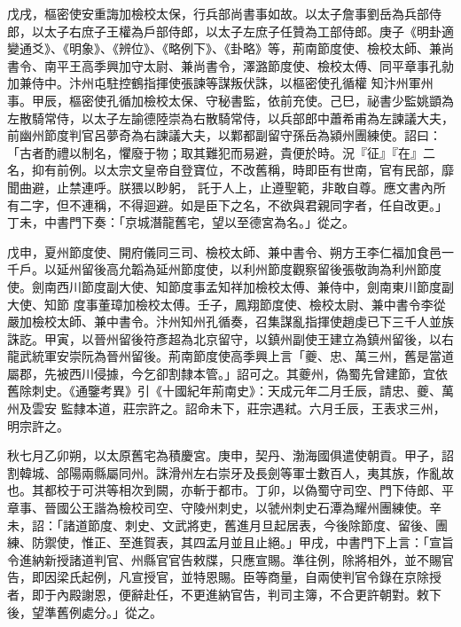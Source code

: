 \begin{pinyinscope}
 戊戌，樞密使安重誨加檢校太保，行兵部尚書事如故。以太子詹事劉岳為兵部侍郎，以太子右庶子王權為戶部侍郎，以太子左庶子任贊為工部侍郎。庚子《明卦適變通爻》、《明象》、《辨位》、《略例下》、《卦略》等，荊南節度使、檢校太師、兼尚書令、南平王高季興加守太尉、兼尚書令，澤潞節度使、檢校太傅、同平章事孔勍加兼侍中。汴州屯駐控鶴指揮使張諫等謀叛伏誅，以樞密使孔循權
 知汴州軍州事。甲辰，樞密使孔循加檢校太保、守秘書監，依前充使。己巳，祕書少監姚顗為左散騎常侍，以太子左諭德陸崇為右散騎常侍，以兵部郎中蕭希甫為左諫議大夫，前幽州節度判官呂夢奇為右諫議大夫，以鄴都副留守孫岳為潁州團練使。詔曰：「古者酌禮以制名，懼廢于物；取其難犯而易避，貴便於時。況『征』『在』二名，抑有前例。以太宗文皇帝自登寶位，不改舊稱，時即臣有世南，官有民部，靡聞曲避，止禁連呼。朕猥以眇躬，
 託于人上，止遵聖範，非敢自尊。應文書內所有二字，但不連稱，不得迴避。如是臣下之名，不欲與君親同字者，任自改更。」丁未，中書門下奏：「京城潛龍舊宅，望以至德宮為名。」從之。



 戊申，夏州節度使、開府儀同三司、檢校太師、兼中書令、朔方王李仁福加食邑一千戶。以延州留後高允韜為延州節度使，以利州節度觀察留後張敬詢為利州節度使。劍南西川節度副大使、知節度事孟知祥加檢校太傅、兼侍中，劍南東川節度副大使、知節
 度事董璋加檢校太傅。壬子，鳳翔節度使、檢校太尉、兼中書令李從嚴加檢校太師、兼中書令。汴州知州孔循奏，召集謀亂指揮使趙虔已下三千人並族誅訖。甲寅，以晉州留後符彥超為北京留守，以鎮州副使王建立為鎮州留後，以右龍武統軍安崇阮為晉州留後。荊南節度使高季興上言「夔、忠、萬三州，舊是當道屬郡，先被西川侵據，今乞卻割隸本管。」詔可之。其夔州，偽蜀先曾建節，宜依舊除刺史。《通鑒考異》引《十國紀年荊南史》：天成元年二月壬辰，請忠、夔、萬州及雲安
 監隸本道，莊宗許之。詔命未下，莊宗遇弒。六月壬辰，王表求三州，明宗許之。



 秋七月乙卯朔，以太原舊宅為積慶宮。庚申，契丹、渤海國俱遣使朝貢。甲子，詔割韓城、郃陽兩縣屬同州。誅滑州左右崇牙及長劍等軍士數百人，夷其族，作亂故也。其都校于可洪等相次到闕，亦斬于都市。丁卯，以偽蜀守司空、門下侍郎、平章事、晉國公王諧為檢校司空、守陵州刺史，以虢州刺史石潭為耀州團練使。辛未，詔：「諸道節度、刺史、文武將吏，舊進月旦起居表，今後除節度、留後、團
 練、防禦使，惟正、至進賀表，其四孟月並且止絕。」甲戌，中書門下上言：「宣旨令進納新授諸道判官、州縣官官告敕牒，只應宣賜。準往例，除將相外，並不賜官告，即因梁氏起例，凡宣授官，並特恩賜。臣等商量，自兩使判官令錄在京除授者，即于內殿謝恩，便辭赴任，不更進納官告，判司主簿，不合更許朝對。敕下後，望準舊例處分。」從之。




\end{pinyinscope}
